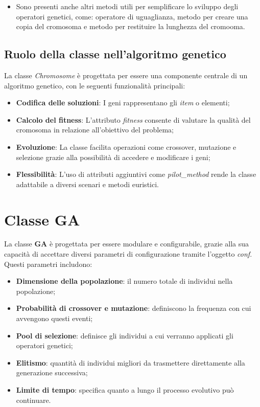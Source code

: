 \begin{itemize}
    \item Sono presenti anche altri metodi utili per semplificare lo sviluppo degli operatori genetici, come: operatore di uguaglianza, metodo per creare una copia del cromosoma e metodo per restituire la lunghezza del cromooma.
\end{itemize}

\subsection{Ruolo della classe nell'algoritmo genetico}

La classe \emph{Chromosome} è progettata per essere una componente centrale di un algoritmo genetico, con le seguenti funzionalità principali:
\begin{itemize}
    \item \textbf{Codifica delle soluzioni}: I geni rappresentano gli \emph{item} o elementi;
    \item \textbf{Calcolo del fitness}: L'attributo \emph{fitness} consente di valutare la qualità del cromosoma in relazione all'obiettivo del problema;
    \item \textbf{Evoluzione}: La classe facilita operazioni come crossover, mutazione e selezione grazie alla possibilità di accedere e modificare i geni;
    \item \textbf{Flessibilità}: L'uso di attributi aggiuntivi come \emph{pilot\_method} rende la classe adattabile a diversi scenari e metodi euristici.
\end{itemize}

\section{Classe GA}

La classe \textbf{GA} è progettata per essere modulare e configurabile, grazie alla sua capacità di accettare diversi parametri di configurazione tramite l'oggetto \emph{conf}. Questi parametri includono:
\begin{itemize}
    \item \textbf{Dimensione della popolazione}: il numero totale di individui nella popolazione;
    \item \textbf{Probabilità di crossover e mutazione}: definiscono la frequenza con cui avvengono questi eventi;
    \item \textbf{Pool di selezione}: definisce gli individui a cui verranno applicati gli operatori genetici;
    \item \textbf{Elitismo}: quantità di individui migliori da trasmettere direttamente alla generazione successiva;
    \item \textbf{Limite di tempo}: specifica quanto a lungo il processo evolutivo può continuare.
\end{itemize}

